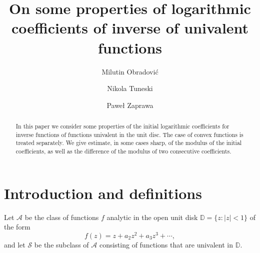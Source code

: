 \documentclass{amsart}
\newcommand{\D}{{\mathbb D}}
\def\be{\begin{equation}}
\def\ee{\end{equation}}
\begin{document}


\title[Some properties of logarithmic coefficients of inverse functions]{On some properties of logarithmic coefficients of inverse of univalent functions}

\author[M. Obradovi\'{c}]{Milutin Obradovi\'{c}}
\address{Department of Mathematics,
Faculty of Civil Engineering, University of Belgrade,
Bulevar Kralja Aleksandra 73, 11000, Belgrade, Serbia}

\author[N. Tuneski]{Nikola Tuneski}
\address{Department of Mathematics and Informatics, Faculty of Mechanical Engineering, Ss. Cyril and Methodius
University in Skopje, Karpo\v{s} II b.b., 1000 Skopje, Republic of North Macedonia.}

\author[P. Zaprawa]{Pawe{\l} Zaprawa}
\address{Department of Mathematic, Faculty of Mechanical Engineering, Lublin University of Technology, Poland.}





\begin{abstract}
In this paper we consider some properties of the initial logarithmic coefficients for inverse functions of functions univalent in the unit disc. The case of convex functions is treated separately. We give estimate, in some cases sharp, of the modulus of the initial coefficients, as well as the difference of the modulus of two consecutive coefficients.
\end{abstract}


\maketitle


\section{Introduction and definitions}

\medskip

Let $\mathcal{A}$ be the class of functions $f$ analytic in the open unit disk $\D=\{z:|z|<1\}$ of the form
\be\label{eq-1}
f(z)=z+a_2z^2+a_3z^3+\cdots,
\ee
and let $\mathcal{S}$ be the subclass of $\mathcal{A}$ consisting of functions that are univalent in $\D$.
\end{document}
